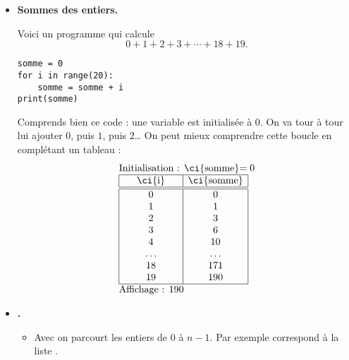 \documentclass[11pt,class=report,crop=false]{standalone}
\begin{document}
\begin{cours}
\begin{itemize}
  \item \textbf{Sommes des entiers.}

Voici un programme qui calcule 
$$0+1+2+3+\cdots + 18 +19.$$

\begin{center}
\begin{minipage}{0.5\textwidth} 
\begin{lstlisting}
somme = 0
for i in range(20):
    somme = somme + i
print(somme)
\end{lstlisting}
\end{minipage}
\end{center} 

Comprends bien ce code : une variable  est initialisée à $0$. 
On va tour à tour lui ajouter $0$, puis $1$, puis $2$\ldots{}
On peut mieux comprendre cette boucle en complétant un tableau :
  $$
  \begin{array}{l}
  \text{Initialisation : \ci{somme}$=0$}    \\
  \begin{array}{|c|c|}
  \hline  
   \text{\ci{i}} &  \text{\ci{somme}} \\
  \hline\hline
  0 & 0 \\  
  1 & 1 \\
  2 & 3 \\
  3 & 6 \\
  4 & 10\\
  \hspace*{5ex}\ldots\hspace*{5ex} & \hspace*{5ex}\ldots\hspace*{5ex} \\
  18 & 171 \\
  19 & 190 \\ 
  \hline
  \end{array} \\
  \text{Affichage : $190$}  
  \end{array} 
  $$ 
\end{itemize} 

\mybox
{ 
 \begin{minipage}{0.95\textwidth}
 \begin{itemize}
 \item \textbf{.}
	\begin{itemize}
	  \item Avec  on parcourt les entiers de $0$ à $n-1$.
	  Par exemple  correspond à la liste \ci{[0, 1, 2, 3, 4, 5, 6, 7, 8, 9]}. 
	  

\end{itemize}
\end{itemize}
\end{minipage}}
\end{cours}
\end{document}
